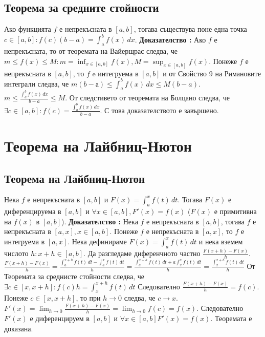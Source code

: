 \documentclass[fleqn,12pt]{article}
\begin{document}
\begin{flushleft}
\subsection{Теорема за средните стойности}
Ако функцията $f$ е непрекъсната в $[a,b]$, тогава съществува поне една точка $c \in [a,b]: f(c)(b-a) = \int_{a}^{b}  f(x)\,dx$.
\textbf{Доказателство :} Ако $f$ е непрекъсната, то от теоремата на Вайерщрас следва, че $m \leq f(x) \leq M: m = \inf_{x \in [a,b]}f(x), M = \sup_{x \in [a,b]}f(x)$.
Понеже $f$ е непрекъсната в $[a,b]$, то $f$ e интегруема в $[a,b]$ и от Свойство 9 на Римановите интеграли следва, че $m(b-а) \leq \int_{a}^{b}  f(x)\,dx \leq M(b-a)$.\\
$m \leq \frac{\int_{a}^{b} f(x)\,dx}{b-a} \leq M$. От следстивето от теоремата на Болцано следва, че $\exists c \in [a,b]: f(c) = \frac{\int_{a}^{b} f(x)\,dx}{b-a}$.
С това доказателството е завършено.

\section{Теорема на Лайбниц-Нютон}
\subsection{Теорема на Лайбниц-Нютон}
Нека $f$ е непрекъсната в $[a,b]$ и $F(x)=\int_{a}^{x} f(t)\,dt$. Тогава $F(x)$ е диференцируема в $[a,b]$ и $\forall x \in [a,b], F'(x)=f(x)$ ($F(x)$ е примитивна на $f(x)$ в $[a,b]$).
\textbf{Доказателство :} Нека $f$ е непрекъсната в $[a,b]$, тогава $f$ е непрекъсната в $[a,x], x \in [a,b]$. Понеже  $f$ е непрекъсната в $[a,x]$, то $f$ е интегруема в $[a,x]$.
Нека дефинираме $F(x)=\int_{a}^{x} f(t)\,dt$ и нека вземем числото $h: x+h\in[a,b]$. Да разгледаме диференчното частно $\frac{F(x+h)-F(x)}{h}$.
$\frac{F(x+h)-F(x)}{h} = \frac{\int_{a}^{x+h} f(t)\,dt - \int_{a}^{x} f(t)\,dt}{h} = \frac{\int_{a}^{x+h} f(t)\,dt + a\int_{x}^{a} f(t)\,dt}{h} = \frac{\int_{x}^{x+h} f(t)\,dt}{h}$
От Теоремата за среднисте стойности следва, че $\exists c \in [x,x+h]: f(c)h = \int_{x}^{x+h} f(t)\,dt$
Следователно $\frac{F(x+h)-F(x)}{h} = f(c)$. Понеже $c \in [x,x+h]$, то при $h \rightarrow 0$ следва, че $c \rightarrow x$.
$F'(x) = \lim_{h \rightarrow 0} \frac{F(x+h)-F(x)}{h} = \lim_{h \rightarrow 0} f(c) = f(x)$. Следователно $F'(x)$ е диференцируем в $[a,b]$ и $\forall x \in [a,b] F'(x)=f(x)$.
Теоремата е доказана.


\end{flushleft}
\end{document}
